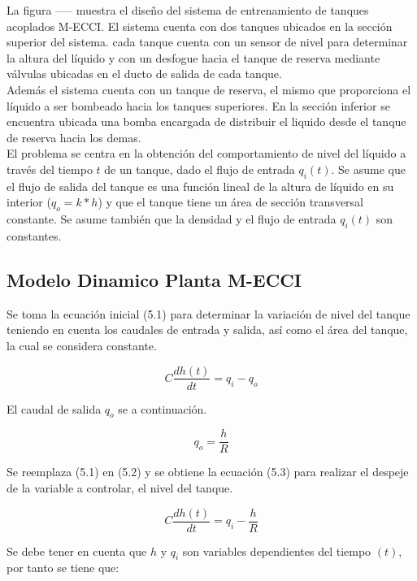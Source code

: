 \documentclass[a4paper,12pt,twoside]{proyectotanquesecci}
\begin{document}
La figura ----- muestra el diseño del sistema de entrenamiento de tanques acoplados M-ECCI. El sistema cuenta con dos tanques ubicados en la sección superior del sistema. cada tanque cuenta con un sensor de nivel para determinar la altura del líquido y con un desfogue hacia el tanque de reserva mediante válvulas
ubicadas en el ducto de salida de cada tanque. \\

Además el sistema cuenta con un tanque de reserva, el mismo que proporciona el líquido a ser bombeado hacia los tanques superiores. En la sección inferior se encuentra ubicada una bomba encargada de distribuir el liquido desde el tanque de reserva hacia los demas. \\

El problema se centra en la obtención del comportamiento de nivel del líquido a través del tiempo $t$ de un tanque, dado el flujo de entrada $q_{i}(t)$. Se asume que el flujo de salida del tanque es una función lineal de la altura de líquido en su interior ($q_{o}=k*h$) y que el tanque tiene un área de sección transversal constante. Se asume también que la densidad y el flujo de entrada $q_{i}(t)$ son constantes.

\subsection{Modelo Dinamico Planta M-ECCI}

Se toma la ecuación inicial (5.1) para determinar la variación de nivel del tanque teniendo en cuenta los caudales de entrada y salida, así como el área del tanque, la cual se considera constante.

\begin{equation}
C\frac {dh\left( t\right) }{dt}=q_{i}-q_{o}
\end{equation}

El caudal de salida $q_{o}$ se a continuación.

\begin{equation}
q_{o}=\frac{h}{R}
\end{equation}

Se reemplaza (5.1) en (5.2) y se obtiene la ecuación (5.3) para realizar el despeje de la variable a controlar, el nivel del tanque.

\begin{equation}
C\frac {dh\left( t\right) }{dt}=q_{i}-\frac {h}{R}
\end{equation}

Se debe tener en cuenta que $h$ y $q_{i}$ son variables dependientes del tiempo $(t)$, por tanto se tiene que:
\end{document}
